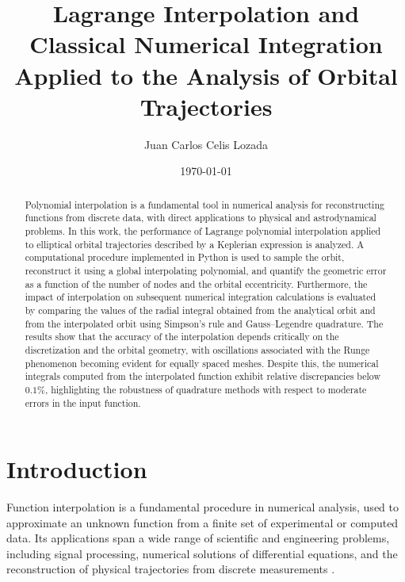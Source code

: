 \documentclass[reprint,amsmath,amssymb,aps]{revtex4-2}
\begin{document}
	
	\title{Lagrange Interpolation and Classical Numerical Integration Applied to the Analysis of Orbital Trajectories}
	
	\author{Juan Carlos Celis Lozada}
	
	\date{\today}
	
	\begin{abstract}
		Polynomial interpolation is a fundamental tool in numerical analysis for reconstructing functions from discrete data, with direct applications to physical and astrodynamical problems. In this work, the performance of Lagrange polynomial interpolation applied to elliptical orbital trajectories described by a Keplerian expression is analyzed. A computational procedure implemented in Python is used to sample the orbit, reconstruct it using a global interpolating polynomial, and quantify the geometric error as a function of the number of nodes and the orbital eccentricity. Furthermore, the impact of interpolation on subsequent numerical integration calculations is evaluated by comparing the values of the radial integral obtained from the analytical orbit and from the interpolated orbit using Simpson's rule and Gauss--Legendre quadrature. The results show that the accuracy of the interpolation depends critically on the discretization and the orbital geometry, with oscillations associated with the Runge phenomenon becoming evident for equally spaced meshes. Despite this, the numerical integrals computed from the interpolated function exhibit relative discrepancies below $0.1\%$, highlighting the robustness of quadrature methods with respect to moderate errors in the input function.
	\end{abstract}
	
	
	\maketitle
	
	\section{Introduction}
	
	Function interpolation is a fundamental procedure in numerical analysis, used to approximate an unknown function from a finite set of experimental or computed data. Its applications span a wide range of scientific and engineering problems, including signal processing, numerical solutions of differential equations, and the reconstruction of physical trajectories from discrete measurements \cite{BurdenFaires,Atkinson}.
	
\end{document}
